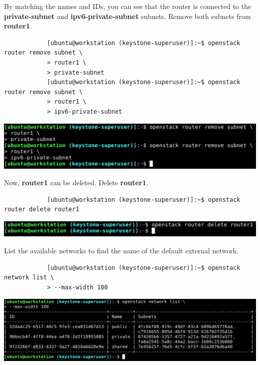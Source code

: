 \documentclass[letterpaper, 12pt]{article}
\begin{document}
\begin{enumerate}
    \begin{labstep}
        By matching the names and IDs, you can see that the router is connected to the \textbf{private-subnet} and \textbf{ipv6-private-subnet} subnets.
        Remove both subnets from \textbf{router1}.
        \begin{lstlisting}
            [ubuntu@workstation (keystone-superuser)]:~$ openstack router remove subnet \
            > router1 \
            > private-subnet
            [ubuntu@workstation (keystone-superuser)]:~$ openstack router remove subnet \
            > router1 \
            > ipv6-private-subnet
        \end{lstlisting}

        \begin{center}
            \includegraphics[width=\linewidth]{images/part1/step17.png}
        \end{center}
    \end{labstep}

    \begin{labstep}
        Now, \textbf{router1} can be deleted.
        Delete \textbf{router1}.
        \begin{lstlisting}
            [ubuntu@workstation (keystone-superuser)]:~$ openstack router delete router1
        \end{lstlisting}

        \begin{center}
            \includegraphics[width=\linewidth]{images/part1/step18.png}
        \end{center}
    \end{labstep}

    \begin{labstep}
        List the available networks to find the name of the default external network.
        \begin{lstlisting}
            [ubuntu@workstation (keystone-superuser)]:~$ openstack network list \
            > --max-width 100
        \end{lstlisting}

        \begin{center}
            \includegraphics[width=\linewidth]{images/part1/step19.png}
        \end{center}
    \end{labstep}


\end{enumerate}
\end{document}
